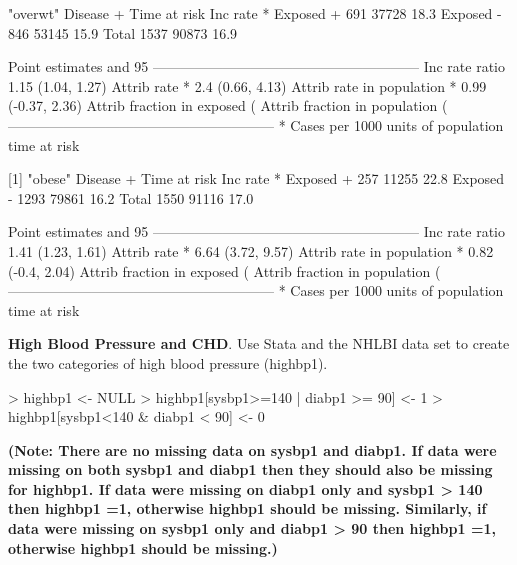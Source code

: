 \documentclass{article}
\begin{document}
\begin{Schunk}
\begin{Soutput}
[1] "overwt"
             Disease +    Time at risk        Inc rate *
Exposed +          691           37728              18.3
Exposed -          846           53145              15.9
Total             1537           90873              16.9

Point estimates and 95 % CIs:
---------------------------------------------------------
Inc rate ratio                           1.15 (1.04, 1.27)
Attrib rate *                            2.4 (0.66, 4.13)
Attrib rate in population *              0.99 (-0.37, 2.36)
Attrib fraction in exposed (%)           13.08 (3.76, 21.49)
Attrib fraction in population (%)        5.88 (4.23, 7.5)
---------------------------------------------------------
 * Cases per 1000 units of population time at risk 


[1] "obese"
             Disease +    Time at risk        Inc rate *
Exposed +          257           11255              22.8
Exposed -         1293           79861              16.2
Total             1550           91116              17.0

Point estimates and 95 % CIs:
---------------------------------------------------------
Inc rate ratio                           1.41 (1.23, 1.61)
Attrib rate *                            6.64 (3.72, 9.57)
Attrib rate in population *              0.82 (-0.4, 2.04)
Attrib fraction in exposed (%)           29.1 (18.62, 38.03)
Attrib fraction in population (%)        4.82 (4.37, 5.27)
---------------------------------------------------------
 * Cases per 1000 units of population time at risk 
\end{Soutput}
\end{Schunk}
\pagebreak
\textbf{High Blood Pressure and CHD}. Use Stata and the NHLBI data set to create the two categories of high blood pressure (highbp1).

\begin{Schunk}
\begin{Sinput}
> highbp1 <- NULL
> highbp1[sysbp1>=140 | diabp1 >= 90] <- 1
> highbp1[sysbp1<140 & diabp1 < 90] <- 0
\end{Sinput}
\end{Schunk}


\textbf{(Note: There are no missing data on sysbp1 and diabp1. If data were missing on both sysbp1 and diabp1 then they should also be missing for highbp1. If data were missing on diabp1 only and sysbp1 > 140 then highbp1 =1, otherwise highbp1 should be missing. Similarly, if data were missing on sysbp1 only and diabp1 > 90 then highbp1 =1, otherwise highbp1 should be missing.)}
\end{document}
